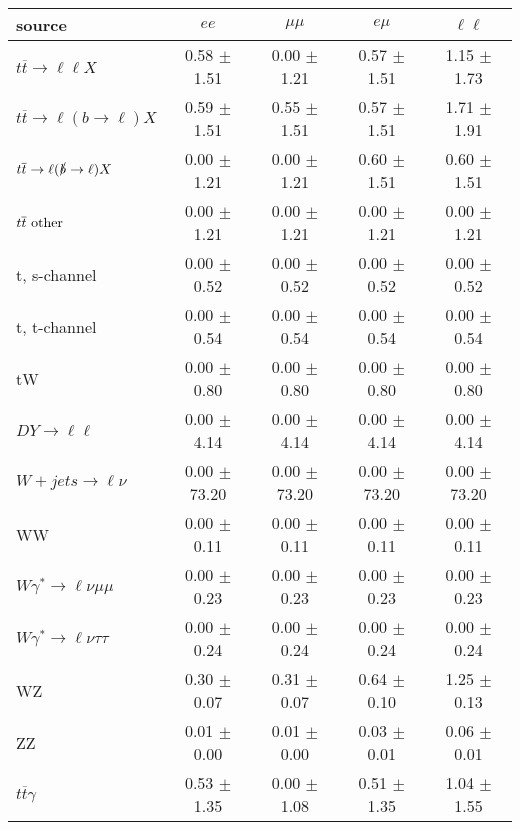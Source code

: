 \begin{tabular}{l|cccc} \hline\hline
source & $ee$ & $\mu\mu$ & $e\mu$ & $\ell\ell $ \\
\hline
$t\overline{t} \rightarrow \ell \ell X$ &  0.58 $\pm$  1.51 &  0.00 $\pm$  1.21 &  0.57 $\pm$  1.51 &  1.15 $\pm$  1.73 \\
$t\overline{t} \rightarrow \ell (b \rightarrow \ell) X$ &  0.59 $\pm$  1.51 &  0.55 $\pm$  1.51 &  0.57 $\pm$  1.51 &  1.71 $\pm$  1.91 \\
$t\overline{t} \rightarrow \ell (\slashed b \rightarrow \ell) X$ &  0.00 $\pm$  1.21 &  0.00 $\pm$  1.21 &  0.60 $\pm$  1.51 &  0.60 $\pm$  1.51 \\
        $t\overline{t}\ \rm{other}$ &  0.00 $\pm$  1.21 &  0.00 $\pm$  1.21 &  0.00 $\pm$  1.21 &  0.00 $\pm$  1.21 \\
\hline
                       t, s-channel &  0.00 $\pm$  0.52 &  0.00 $\pm$  0.52 &  0.00 $\pm$  0.52 &  0.00 $\pm$  0.52 \\
                       t, t-channel &  0.00 $\pm$  0.54 &  0.00 $\pm$  0.54 &  0.00 $\pm$  0.54 &  0.00 $\pm$  0.54 \\
                                 tW &  0.00 $\pm$  0.80 &  0.00 $\pm$  0.80 &  0.00 $\pm$  0.80 &  0.00 $\pm$  0.80 \\
\hline
         $DY \rightarrow \ell \ell$ &  0.00 $\pm$  4.14 &  0.00 $\pm$  4.14 &  0.00 $\pm$  4.14 &  0.00 $\pm$  4.14 \\
      $W+jets \rightarrow \ell \nu$ &  0.00 $\pm$ 73.20 &  0.00 $\pm$ 73.20 &  0.00 $\pm$ 73.20 &  0.00 $\pm$ 73.20 \\
                                 WW &  0.00 $\pm$  0.11 &  0.00 $\pm$  0.11 &  0.00 $\pm$  0.11 &  0.00 $\pm$  0.11 \\
\hline
$W\gamma^{*} \rightarrow \ell \nu \mu\mu$ &  0.00 $\pm$  0.23 &  0.00 $\pm$  0.23 &  0.00 $\pm$  0.23 &  0.00 $\pm$  0.23 \\
$W\gamma^{*} \rightarrow \ell \nu \tau\tau$ &  0.00 $\pm$  0.24 &  0.00 $\pm$  0.24 &  0.00 $\pm$  0.24 &  0.00 $\pm$  0.24 \\
                                 WZ &  0.30 $\pm$  0.07 &  0.31 $\pm$  0.07 &  0.64 $\pm$  0.10 &  1.25 $\pm$  0.13 \\
                                 ZZ &  0.01 $\pm$  0.00 &  0.01 $\pm$  0.00 &  0.03 $\pm$  0.01 &  0.06 $\pm$  0.01 \\
\hline
              $t\overline{t}\gamma$ &  0.53 $\pm$  1.35 &  0.00 $\pm$  1.08 &  0.51 $\pm$  1.35 &  1.04 $\pm$  1.55 \\

\end{tabular}
